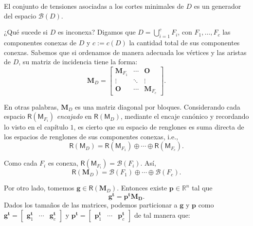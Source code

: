 \begin{cor}
El conjunto de tensiones asociadas a los cortes minimales de $D$ es un generador del espacio $\mathcal{B}(D)$.
\end{cor}

¿Qué sucede si $D$ es inconexa? Digamos que $D = \bigcup_{i=1}^{c}F_{i}$, con $F_{1}, \ldots, F_{c}$ las componentes conexas de $D$ y $c:=c(D)$ la cantidad total de sus componentes conexas. Sabemos que si ordenamos de manera adecuada los vértices y las aristas de $D$, su matriz de incidencia tiene la forma:
$$
\mathbf{M}_{D} = \begin{bmatrix}
\mathbf{M}_{F_{1}} & \cdots  & \mathbf{O} \\ 
\vdots & \ddots  & \vdots \\ 
\mathbf{O} & \cdots & \mathbf{M}_{F_{c}}
\end{bmatrix}.
$$

En otras palabras, $\mathbf{M}_{D}$ es una matriz diagonal por bloques. Considerando cada espacio $\mathsf{R}(\mathsf{M}_{F_{i}})$ \textit{encajado} en $\mathsf{R}(\mathsf{M}_{D})$, mediante el encaje canónico y recordando lo visto en el capítulo $1$, es cierto que su espacio de renglones es suma directa de los espacios de renglones de sus componentes conexas, i.e., $$\mathsf{R}(\mathsf{M}_{D}) = \mathsf{R}(\mathsf{M}_{F_{1}}) \oplus \cdots \oplus \mathsf{R}(\mathsf{M}_{F_{c}}).$$

Como cada $F_{i}$ es conexa, $\mathsf{R}(\mathsf{M}_{F_{i}}) = \mathcal{B}(F_{i})$. Así, $$\mathsf{R}(\mathbf{M}_{D}) = \mathcal{B}(F_{1}) \oplus \cdots \oplus \mathcal{B}(F_{c}).$$

Por otro lado, tomemos $\mathbf{g} \in \mathsf{R}(\mathbf{M}_{D})$. Entonces existe $\mathbf{p} \in \mathbb{R}^{n}$ tal que $$\mathbf{g^{t}} = \mathbf{p^{t}M_{D}}.$$ Dados los tamaños de las matrices, podemos particionar a $\mathbf{g}$ y $\mathbf{p}$ como $\mathbf{g^{t}} = \begin{bmatrix}
\mathbf{g}_{1}^{\mathbf{t}} & \cdots  & \mathbf{g}_{c}^{\mathbf{t}} 
\end{bmatrix}$ y $\mathbf{p^{t}} = \begin{bmatrix}
\mathbf{p}_{1}^{\mathbf{t}} & \cdots  & \mathbf{p}_{c}^{\mathbf{t}} 
\end{bmatrix}$ de tal manera que:

